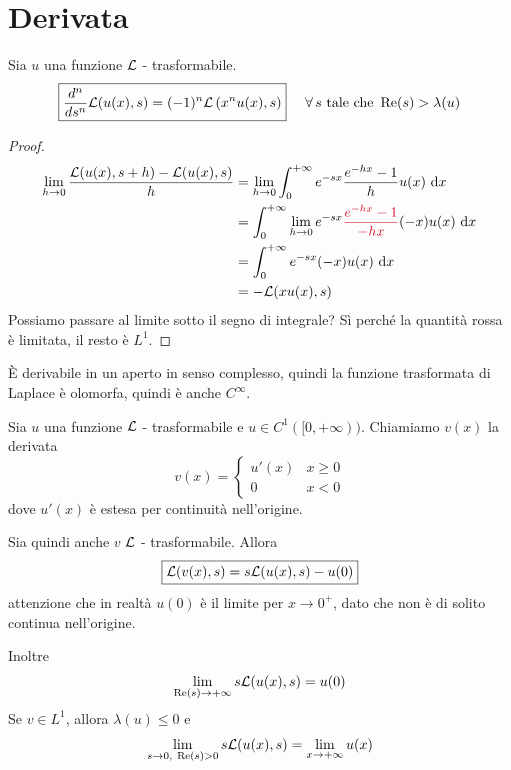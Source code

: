 \section{Derivata}
\begin{thm}
Sia $u$ una funzione $\mathcal{L}$ - trasformabile.
\begin{equation*}
\boxed{\frac{d^{n}}{ds^{n}}\Lc(u(x), s) = (- 1)^{n} \Lc\left(x^{n} u(x), s\right)} \ \ \ \ \forall s\ \text{tale che} \ \Re (s) > \lambda (u)
\end{equation*}
\end{thm}
\begin{proof}
\begin{align*}
\lim\limits_{h\rightarrow 0}\frac{\Lc(u(x), s + h) - \Lc(u(x), s)}{h} & = \lim\limits_{h\rightarrow 0}\int^{+ \infty}_{0} e^{- sx}\frac{e^{- hx} - 1}{h} u(x) \dx\\
 & = \int^{+ \infty}_{0}\lim\limits_{h\rightarrow 0} e^{- sx}\textcolor[rgb]{0.82, 0.01, 0.11}{\frac{e^{- hx} - 1}{- hx}}(- x) u(x) \dx\\
 & = \int^{+ \infty}_{0} e^{- sx}(- x) u(x) \dx\\
 & = - \Lc(xu(x), s)
\end{align*}
Possiamo passare al limite sotto il segno di integrale? Sì perché la quantità rossa è limitata, il resto è $L^{1}$.
\end{proof}

È derivabile in un aperto in senso complesso, quindi la funzione trasformata di Laplace è olomorfa, quindi è anche $C^{\infty}$.
\begin{thm}
Sia $u$ una funzione $\mathcal{L}$ - trasformabile e $u\in C^{1}([0, + \infty))$. Chiamiamo $v(x)$ la derivata
\begin{equation*}
v(x) =
\begin{cases}
u'(x) & x \geq 0\\
0 & x < 0
\end{cases}
\end{equation*}
dove $u'(x)$ è estesa per continuità nell'origine.

Sia quindi anche $v$ $\mathcal{L}$ - trasformabile. Allora
\begin{equation*}
\boxed{\mathcal{L}(v(x), s) = s\mathcal{L}(u(x), s) - u(0)}
\end{equation*}
attenzione che in realtà $u(0)$ è il limite per $x\rightarrow 0^{+}$, dato che non è di solito continua nell'origine.

Inoltre
\begin{equation*}
\lim_{\operatorname{Re} (s)\rightarrow + \infty} s\mathcal{L}(u(x), s) = u(0)
\end{equation*}
Se $v\in L^{1}$, allora $\lambda (u) \leq 0$ e
\begin{equation*}
\lim\limits_{s\rightarrow 0, \ \operatorname{Re} (s) > 0} s\mathcal{L}(u(x), s) = \lim_{x\rightarrow + \infty} u(x)
\end{equation*}
\end{thm}

